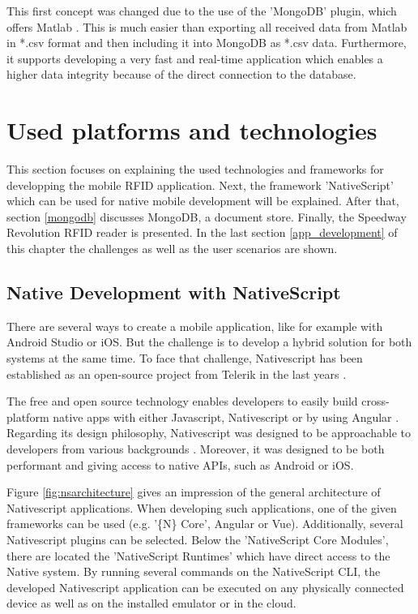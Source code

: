 This first concept was changed due to the use of the 'MongoDB' plugin, which offers Matlab \cite{matlab_mongodb}. This is much easier than exporting all received data from Matlab in *.csv format and then including it into MongoDB as *.csv data. Furthermore, it supports developing a very fast and real-time application which enables a higher data integrity because of the direct connection to the database.  

\section{Used platforms and technologies} \label{platforms}

This section focuses on explaining the used technologies and frameworks for developping the mobile RFID application. Next, the framework 'NativeScript' which can be used for native mobile development will be explained. After that, section \ref{mongodb} discusses MongoDB, a document store. Finally, the Speedway Revolution RFID reader is presented. In the last section \ref{app_development} of this chapter the challenges as well as the user scenarios are shown. 

\subsection{Native Development with NativeScript} 

There are several ways to create a mobile application, like for example with Android Studio or iOS. But the challenge is to develop a hybrid solution for both systems at the same time.
To face that challenge, Nativescript has been established as an open-source project from Telerik in the last years \cite{nativescript}. 

The free and open source technology enables developers to easily build cross-platform native apps with either Javascript, Nativescript or by using Angular \cite{nativescript}. 
Regarding its design philosophy, Nativescript was designed to be approachable to developers from various backgrounds \cite{nativescript}. Moreover, it was designed to be both performant and giving access to native APIs, such as Android or iOS.

Figure \ref{fig:nsarchitecture} gives an impression of the general architecture of Nativescript applications. When developing such applications, one of the given frameworks can be used (e.g. '\{N\} Core', Angular or Vue). Additionally, several Nativescript plugins can be selected. Below the 'NativeScript Core Modules', there are located the 'NativeScript Runtimes' which have direct access to the Native system. By running several commands on the NativeScript \ac{CLI}, the developed Nativescript application can be executed on any physically connected device as well as on the installed emulator or in the cloud. 


